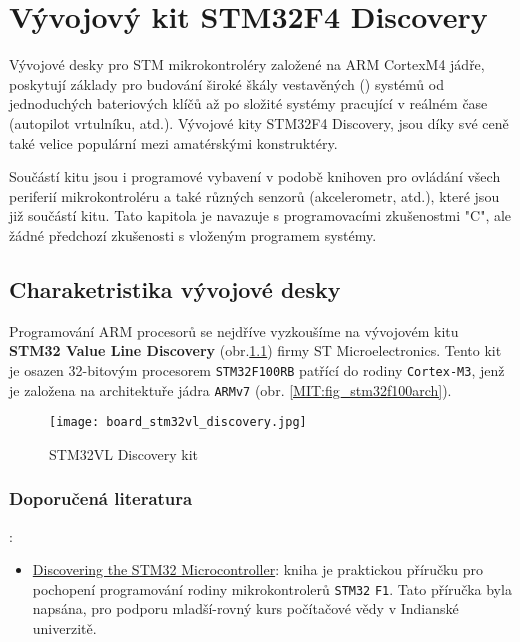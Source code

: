\setchaptertoc
\chapter{Vývojový kit STM32F4 Discovery}

  Vývojové desky pro STM mikrokontroléry založené na ARM CortexM4 jádře, poskytují základy pro 
  budování široké škály vestavěných (\wikiEmbedded) systémů od jednoduchých bateriových klíčů až po 
  složité systémy pracující v reálném čase (autopilot vrtulníku, atd.). Vývojové kity STM32F4 
  Discovery, jsou díky své ceně také velice populární mezi amatérskými konstruktéry.
  
  Součástí kitu jsou i programové vybavení v podobě knihoven pro ovládání všech periferií 
  mikrokontroléru a také různých senzorů (akcelerometr, atd.), které jsou již součástí kitu.  
  Tato kapitola je navazuje 
  s programovacími zkušenostmi "C", ale žádné předchozí zkušenosti s vloženým programem
  systémy.
  
  \section{Charaketristika vývojové desky}
    Programování ARM procesorů se nejdříve vyzkoušíme na vývojovém kitu \textbf{STM32 Value Line 
    Discovery} (obr.\ref{MIT:fig_stm32vlkit}) firmy ST Microelectronics. Tento kit je osazen 
    32-bitovým procesorem \texttt{STM32F100RB} patřící do rodiny \texttt{Cortex-M3}, jenž je 
    založena na architektuře jádra \texttt{ARMv7} (obr. \ref{MIT:fig_stm32f100arch}). 
  
    \begin{figure}[ht!] %
      \centering
      \texttt{[image: board\_stm32vl\_discovery.jpg]}
      \caption{STM32VL Discovery kit}
      \label{MIT:fig_stm32vlkit}
    \end{figure}
    
    \subsection{Doporučená literatura}:
    \begin{itemize}
      \item \href{http://librarian/stable.php?id=143}{Discovering the STM32 Microcontroller}: 
            kniha je praktickou příručku pro pochopení programování rodiny mikrokontrolerů 
            \texttt{STM32} \texttt{F1}. Tato příručka byla napsána, pro podporu mladší-rovný kurs 
            počítačové vědy v 
      Indianské univerzitě. 
    \end{itemize}
  
